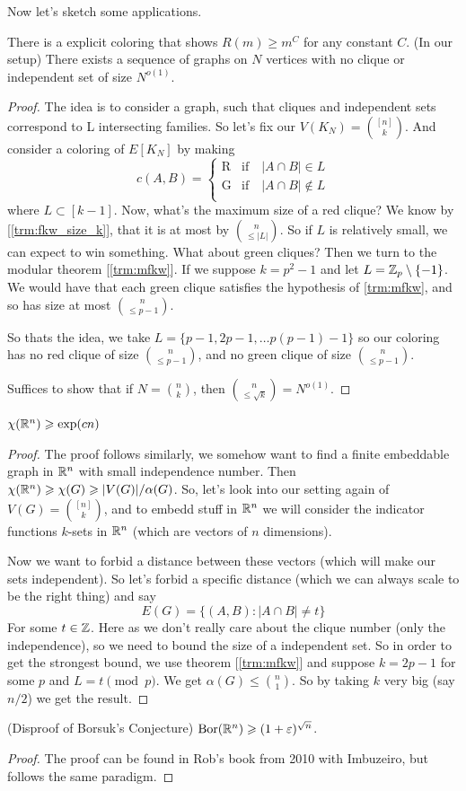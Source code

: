Now let's sketch some applications.
\begin{theorem}
	There is a explicit coloring that shows $R(m) \geq m^C$ for any constant $C$.
	(In our setup) There exists a sequence of graphs on $N$ vertices
	with no clique or independent set
	of size $N^{o(1)}$.
\end{theorem}
\begin{proof}
	The idea is to consider a graph, such that cliques and independent
	sets correspond to L intersecting families.
	So let's fix our $V(K_N) = \binom{[n]}{k}$. And consider a coloring
	of $E[K_N]$ by making
	\[
		c(A,B) =
		\begin{cases}
			\text{R} & \text{if} \quad |A\cap B| \in L      \\
			\text{G} & \text{if} \quad |A\cap B| \not \in L \\
		\end{cases}
	\]
	where $L \subset [k-1]$. Now, what's the maximum size of a red
	clique? We know by [\ref{trm:fkw_size_k}], that it is at most by
	$\binom{n}{\leq|L|}$.
	So if $L$ is relatively small, we can expect to win something. What
	about green cliques? Then we turn to the modular theorem [\ref{trm:mfkw}].
	If we suppose $k = p^2 - 1$ and let $L = \mathbb{Z}_p \setminus \{-1\}$. We
	would have that each green clique satisfies the hypothesis of \ref{trm:mfkw},
	and so has size at most $\binom{n}{\leq p-1}$.

	So thats the idea, we take $L = \{p-1,2p -1, \dots p(p-1) - 1\}$ so
	our coloring has no red clique of size $\binom{n}{\leq p-1}$,
	and no green clique of size $\binom{n}{\leq p-1}$.

	Suffices to show that if $N = \binom{n}{k}$, then $\binom{n}{\leq
	\sqrt{k}} = N^{o(1)}$.
\end{proof}

\begin{theorem}
	$\chi(\mathbb{R}^n) \geqslant \exp(cn)$
\end{theorem}
\begin{proof}
	The proof follows similarly, we somehow want to find a finite
	embeddable graph in $\mathbb{R}^n$ with small independence number.
	Then $\chi(\mathbb{R}^n) \geqslant \chi(G) \geqslant |V(G)|/\alpha(G)$. So, let's
	look into our setting again of
	$V(G) = \binom{[n]}{k}$, and to embedd stuff in $\mathbb{R}^n$ we will
	consider the indicator functions $k$-sets in $\mathbb{R}^n$ (which are vectors
	of $n$ dimensions).

	Now we want to forbid a distance between these vectors (which will
	make our sets independent). So let's forbid a specific distance (which
	we can always scale to be the right thing) and say
	\[
		E(G) = \{
			(A,B) : |A \cap B| \neq t
		\}
	\]
	For some $t \in \mathbb{Z}$. Here as we don't really care about the clique
	number (only the independence), so we need to bound the size
	of a independent set. So in order to get the strongest bound, we
	use theorem [\ref{trm:mfkw}] and suppose $k = 2p - 1$ for some $p$
	and $L = t \pmod p$. We get
	$\alpha(G) \leq \binom{n}{1}$. So by taking $k$ very big (say
	$n/2$) we get the result.

\end{proof}

\begin{theorem}
	(Disproof of Borsuk's Conjecture) $\text{Bor}(\mathbb{R}^n) \geqslant (1+\varepsilon)^{\sqrt{n}}$.
\end{theorem}
\begin{proof}
	The proof can be found in Rob's book from 2010 with Imbuzeiro, but
	follows the same paradigm.
\end{proof}

